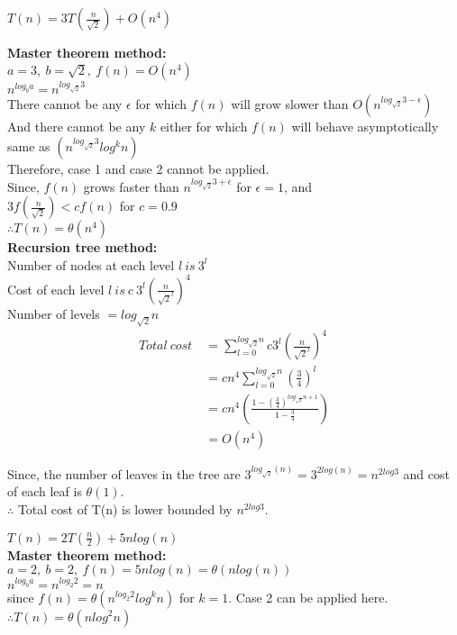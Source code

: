 \documentclass[12pt,twoside]{article}
\begin{document}
\begin{problems}
\begin{problemparts}
\newpage
\problempart %
$T(n) = 3 T(\frac{n}{\sqrt{2}}) + O(n^4)$ \

\textbf{Master theorem method:} \\
$a = 3,\ b = \sqrt{2},\ f(n) = O(n^4)$ \\
$n^{log_b a} = n^{log_{\sqrt{2}} 3}$ \\
There cannot be any $\epsilon$  for which $f(n)$ will grow slower than $O(n^{log_{\sqrt{2}} 3 - \epsilon})$ \\
And there cannot be any $k$ either for which $f(n)$ will behave asymptotically same as $(n^{log_{\sqrt{2}} 3} log^k n)$ \\
Therefore, case 1 and case 2 cannot be applied. \\
Since, $f(n)$ grows faster than $n^{log_{\sqrt{2}} 3 + \epsilon}$ for $\epsilon = 1$, and \\
$3 f(\frac{n}{\sqrt{2}}) < c f(n)$ for $c = 0.9$ \\
$\therefore T(n) = \theta(n^4)$ \\

\textbf{Recursion tree method:} \\
Number of nodes at each level $l\ is\ 3^l$ \\
Cost of each level $l\ is\ c\ 3^l \left( \frac{n}{\sqrt{2}^l} \right)^4$ \\
Number of levels $= log_{\sqrt{2}} n$ \\

\begin{align*}
    Total\ cost\ &= \sum_{l=0}^{log_{\sqrt{2}} n} c 3^l \left( \frac{n}{\sqrt{2}^l}\right)^4 \\
                 &= c n^4 \sum_{l=0}^{log_{\sqrt{2}} n} \left( \frac{3}{4} \right)^l \\
                 &= c n^4 \left( \frac{1 - (\frac{3}{4})^{log_{\sqrt{2}} n + 1 }}{1 - \frac{3}{4}} \right) \\
                 &= O(n^4)
\end{align*}

Since, the number of leaves in the tree are $3^{log_{\sqrt{2}} (n)} = 3^{2 log(n)} = n^{2 log3}$ and cost of each leaf is $\theta(1)$. \\
$\therefore$ Total cost of T(n) is lower bounded by $n^{2log3}$.

\newpage
\problempart %
$T(n) = 2 T(\frac{n}{2}) + 5 n log(n)$ \\
\textbf{Master theorem method: }\\
$a = 2,\ b = 2,\ f(n) = 5 n log(n) = \theta(nlog(n))$ \\
$n^{log_b a} = n^{log_2 2} = n$ \\
since $f(n) = \theta(n^{log_2 2} log^k n)$ for $k = 1$.
Case 2 can be applied here. \\
$\therefore T(n) = \theta(nlog^2 n)$\\


\end{problemparts}
\end{problems}
\end{document}

